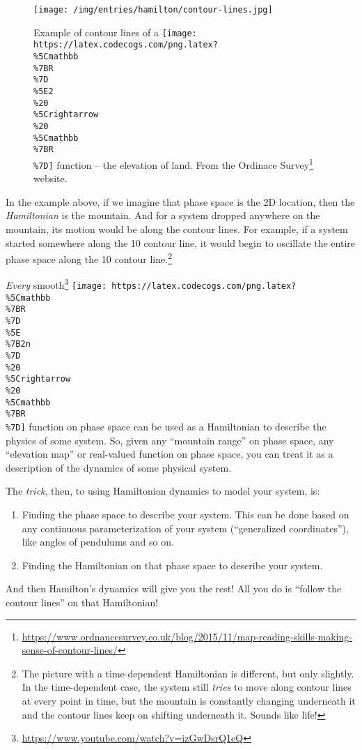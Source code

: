 \documentclass[]{article}
\renewcommand{\href}[2]{#2\footnote{\url{#1}}}
\begin{document}
\begin{figure}
\centering
\texttt{[image: /img/entries/hamilton/contour-lines.jpg]}
\caption{Example of contour lines of a
\texttt{[image: https://latex.codecogs.com/png.latex?\\\%5Cmathbb\\\%7BR\\\%7D\\\%5E2\\\%20\\\%5Crightarrow\\\%20\\\%5Cmathbb\\\%7BR\\\%7D]}
function -- the elevation of land. From the
\href{https://www.ordnancesurvey.co.uk/blog/2015/11/map-reading-skills-making-sense-of-contour-lines/}{Ordinace
Survey} website.}
\end{figure}

In the example above, if we imagine that phase space is the 2D location, then
the \emph{Hamiltonian} is the mountain. And for a system dropped anywhere on the
mountain, its motion would be along the contour lines. For example, if a system
started somewhere along the 10 contour line, it would begin to oscillate the
entire phase space along the 10 contour line.\footnote{The picture with a
  time-dependent Hamiltonian is different, but only slightly. In the
  time-dependent case, the system still \emph{tries} to move along contour lines
  at every point in time, but the mountain is constantly changing underneath it
  and the contour lines keep on shifting underneath it. Sounds like life!}

\emph{Every} \href{https://www.youtube.com/watch?v=izGwDsrQ1eQ}{smooth}
\texttt{[image: https://latex.codecogs.com/png.latex?\\\%5Cmathbb\\\%7BR\\\%7D\\\%5E\\\%7B2n\\\%7D\\\%20\\\%5Crightarrow\\\%20\\\%5Cmathbb\\\%7BR\\\%7D]}
function on phase space can be used as a Hamiltonian to describe the physics of
some system. So, given any ``mountain range'' on phase space, any ``elevation
map'' or real-valued function on phase space, you can treat it as a description
of the dynamics of some physical system.

The \emph{trick}, then, to using Hamiltonian dynamics to model your system, is:

\begin{enumerate}
\def\labelenumi{\arabic{enumi}.}
\item
  Finding the phase space to describe your system. This can be done based on any
  continuous parameterization of your system (``generalized coordinates''), like
  angles of pendulums and so on.
\item
  Finding the Hamiltonian on that phase space to describe your system.
\end{enumerate}

And then Hamilton's dynamics will give you the rest! All you do is ``follow the
contour lines'' on that Hamiltonian!
\end{document}
